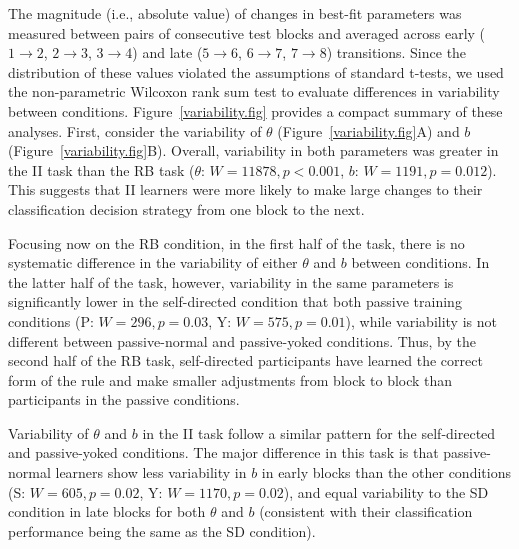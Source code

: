 \documentclass[3p,twocolumn,authoryear,10pt]{elsarticle}
\begin{document}
The magnitude (i.e., absolute value) of changes in best-fit parameters was measured between pairs of consecutive test blocks and averaged across early ($1\rightarrow2$, $2\rightarrow3$, $3\rightarrow4$) and late ($5\rightarrow6$, $6\rightarrow7$, $7\rightarrow8$) transitions. Since the distribution of these values violated the assumptions of standard t-tests, we used the non-parametric Wilcoxon rank sum test to evaluate differences in variability between conditions. Figure~\ref{variability.fig} provides a compact summary of these analyses.  First, consider the variability of $\theta$ (Figure~\ref{variability.fig}A) and $b$ (Figure~\ref{variability.fig}B). Overall, variability in both parameters was greater in the II task than the RB task ($\theta$: $W=11878, p<0.001$, $b$: $W=1191, p=0.012$). This suggests that II learners were more likely to make large changes to their classification decision strategy from one block to the next.

Focusing now on the RB condition, in the first half of the task, there is no systematic difference in the variability of either $\theta$ and $b$ between conditions. In the latter half of the task, however, variability in the same parameters is significantly lower in the self-directed condition that both passive training conditions (P: $W=296, p=0.03$, Y: $W=575, p=0.01$), while variability is not different between passive-normal and passive-yoked conditions. Thus, by the second half of the RB task, self-directed participants have learned the correct form of the rule and make smaller adjustments from block to block than participants in the passive conditions.

Variability of $\theta$ and $b$ in the II task follow a similar pattern for the self-directed and passive-yoked conditions. The major difference in this task is that passive-normal learners show less variability in $b$ in early blocks than the other conditions (S: $W=605, p=0.02$, Y: $W=1170, p=0.02$), and equal variability to the SD condition in late blocks for both $\theta$ and $b$ (consistent with their classification performance being the same as the SD condition).

\end{document}
